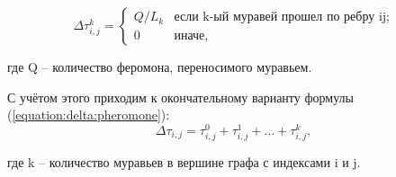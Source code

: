         \begin{equation}
            {\displaystyle \Delta\tau_{i,j}^k={
            \begin{cases}
                Q/L_{k}& {\text{если k-ый муравей прошел по ребру ij;}}\\
                0&{\text{иначе,}}
            \end{cases}}}
            \label{equation:delta:pheromone:Q} 
        \end{equation}
        
        где Q -- количество феромона, переносимого муравьем.
        
        С учётом этого приходим к окончательному варианту формулы (\ref{equation:delta:pheromone}):
        \begin{equation}
            \Delta \tau_{i,j}= \tau_{i,j}^0 + \tau_{i,j}^1 + ... + \tau_{i,j}^k,
            \label{equation:delta:pheromone}
        \end{equation}
       
        где k -- количество муравьев в вершине графа с индексами i и j.
    
        
\newpage